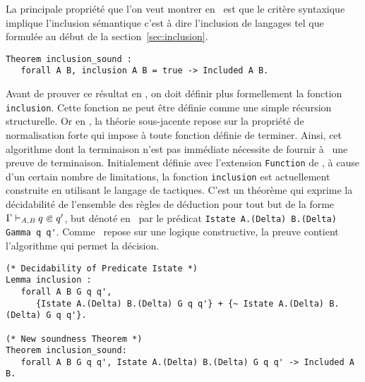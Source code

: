 
La principale propriété que l'on veut montrer en \coq\ est que le critère syntaxique
implique l'inclusion sémantique c'est à dire l'inclusion de langages tel que formulée
au début de la section~\ref{sec:inclusion}.

\begin{lstlisting}
Theorem inclusion_sound :
   forall A B, inclusion A B = true -> Included A B.
\end{lstlisting}

Avant de prouver ce résultat en \coq, on doit définir plus formellement la fonction
\lstinline!inclusion!. Cette fonction ne peut être définie comme une simple récursion structurelle.
Or en \coq, la théorie sous-jacente repose sur la propriété de normalisation forte qui impose à toute
fonction définie de terminer. Ainsi, cet algorithme dont la terminaison n'est pas immédiate
nécessite de fournir à \coq\ une preuve de terminaison.
Initialement définie avec l'extension \lstinline!Function! de \coq, à cause d'un certain nombre de limitations,
la fonction \lstinline!inclusion! est actuellement construite en utilisant le langage de tactiques. C'est un théorème
qui exprime la décidabilité de l'ensemble des règles de déduction pour tout but de la forme $\Gamma \vdash_{\mathit A, \mathit B} q \Subset q'$,
but dénoté en \coq\ par le prédicat \lstinline!Istate A.(Delta) B.(Delta) Gamma q q'!. Comme \coq\ repose sur une logique constructive,
la preuve contient l'algorithme qui permet la décision.

\begin{lstlisting}
(* Decidability of Predicate Istate *)
Lemma inclusion :
   forall A B G q q',
      {Istate A.(Delta) B.(Delta) G q q'} + {~ Istate A.(Delta) B.(Delta) G q q'}.

(* New soundness Theorem *)
Theorem inclusion_sound:
   forall A B G q q', Istate A.(Delta) B.(Delta) G q q' -> Included A B.
\end{lstlisting}

